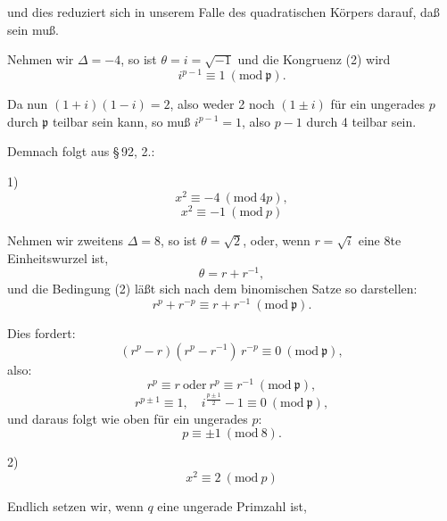 
und dies reduziert sich in unserem Falle des quadratischen
Körpers darauf, daß
sein muß.

Nehmen wir $\Delta = -4$, so ist $\theta = i = \sqrt{-1}$ und die Kongruenz
 (2) wird
\[
i^{p-1} \equiv 1 \ (\mathrm{mod}\ \mathfrak{p}).
\]

Da nun $(1+i)(1-i) = 2$, also weder 2 noch $(1 \pm i)$ für
ein ungerades $p$ durch $\mathfrak{p}$ teilbar sein kann, so muß $i^{p-1} = 1$,
also $p - 1$ durch 4 teilbar sein.

Demnach folgt aus \S\,92, 2.:

1) 
\[
x^2 \equiv -4 \ (\mathrm{mod}\ 4p),
\]
\[
x^2 \equiv -1 \ (\mathrm{mod}\ p)
\]

Nehmen wir zweitens $\Delta = 8$, so ist $\theta = \sqrt{2}$, oder, wenn
$r = \sqrt{i}$ eine 8te Einheitswurzel ist,
\[
\theta = r + r^{-1},
\]
und die Bedingung (2) läßt sich nach dem binomischen Satze
so darstellen:
\[
r^p + r^{-p} \equiv r + r^{-1} \ (\mathrm{mod}\ \mathfrak{p}).
\]

Dies fordert:
\[
(r^p - r)(r^p - r^{-1})\, r^{-p} \equiv 0 \ (\mathrm{mod}\ \mathfrak{p}),
\]
also:
\[
r^p \equiv r \ \text{oder} \ r^p \equiv r^{-1} \ (\mathrm{mod}\ \mathfrak{p}),
\]
\[
r^{p \pm 1} \equiv 1, \quad i^{\frac{p \pm 1}{2}} - 1 \equiv 0 \ (\mathrm{mod}\ \mathfrak{p}),
\]
und daraus folgt wie oben für ein ungerades $p$:
\[
p \equiv \pm 1 \ (\mathrm{mod}\ 8).
\]

2) 
\[
x^2 \equiv 2 \ (\mathrm{mod}\ p)
\]

Endlich setzen wir, wenn $q$ eine ungerade Primzahl ist,
